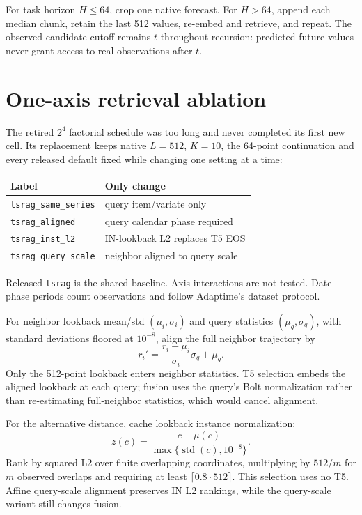 \documentclass[11pt,a4paper]{article}
\begin{document}
For task horizon $H\le64$, crop one native forecast. For $H>64$, append each
median chunk, retain the last 512 values, re-embed and retrieve, and repeat.
The observed candidate cutoff remains $t$ throughout recursion: predicted
future values never grant access to real observations after $t$.

\section{One-axis retrieval ablation}
The retired $2^4$ factorial schedule was too long and never completed its first
new cell. Its replacement keeps native $L=512$, $K=10$, the 64-point
continuation and every released default fixed while changing one setting at a
time:
\begin{center}
\begin{tabular}{ll}\toprule
Label & Only change\\\midrule
\texttt{tsrag\_same\_series} & query item/variate only\\
\texttt{tsrag\_aligned} & query calendar phase required\\
\texttt{tsrag\_inst\_l2} & IN-lookback L2 replaces T5 EOS\\
\texttt{tsrag\_query\_scale} & neighbor aligned to query scale\\\bottomrule
\end{tabular}
\end{center}
Released \texttt{tsrag} is the shared baseline. Axis interactions are not
tested. Date-phase periods count observations and follow Adaptime's dataset
protocol.

For neighbor lookback mean/std $(\mu_i,\sigma_i)$ and query statistics
$(\mu_q,\sigma_q)$, with standard deviations floored at $10^{-8}$, align the full
neighbor trajectory by
\[
 r_i'=\frac{r_i-\mu_i}{\sigma_i}\sigma_q+\mu_q.
\]
Only the 512-point lookback enters neighbor statistics. T5 selection embeds
the aligned lookback at each query; fusion uses the query's Bolt normalization
rather than re-estimating full-neighbor statistics, which would cancel alignment.

For the alternative distance, cache lookback instance normalization:
\[
 z(c)=\frac{c-\mu(c)}{\max\{\operatorname{std}(c),10^{-8}\}}.
\]
Rank by squared L2 over finite overlapping coordinates, multiplying by $512/m$
for $m$ observed overlaps and requiring at least $\lceil0.8\cdot512\rceil$.
This selection uses no T5. Affine query-scale alignment preserves IN L2 rankings,
while the query-scale variant still changes fusion.
\end{document}
